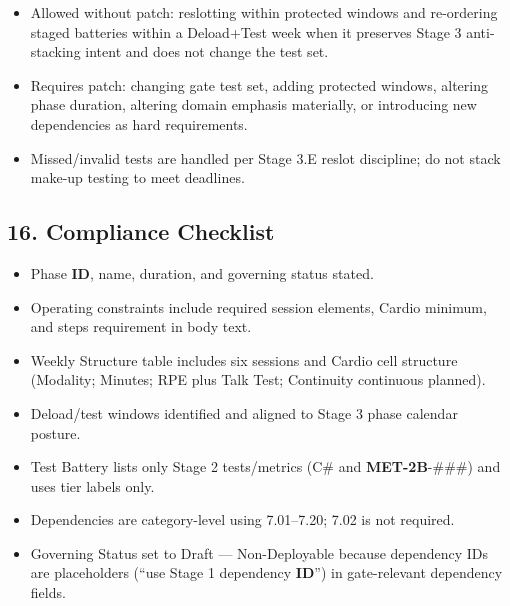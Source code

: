 \documentclass[10pt]{article}
\begin{document}
\begin{itemize}
\item Allowed without patch: reslotting within protected windows and re-ordering staged batteries within a Deload+Test week when it preserves Stage 3 anti-stacking intent and does not change the test set.
\item Requires patch: changing gate test set, adding protected windows, altering phase duration, altering domain emphasis materially, or introducing new dependencies as hard requirements.
\item Missed/invalid tests are handled per Stage 3.E reslot discipline; do not stack make-up testing to meet deadlines.
\end{itemize}

\subsection*{16. Compliance Checklist}

\begin{itemize}
\item Phase \textbf{ID}, name, duration, and governing status stated.
\item Operating constraints include required session elements, Cardio minimum, and steps requirement in body text.
\item Weekly Structure table includes six sessions and Cardio cell structure (Modality; Minutes; RPE plus Talk Test; Continuity continuous planned).
\item Deload/test windows identified and aligned to Stage 3 phase calendar posture.
\item Test Battery lists only Stage 2 tests/metrics (C\# and \textbf{MET-2B}-###) and uses tier labels only.
\item Dependencies are category-level using 7.01–7.20; 7.02 is not required.
\item Governing Status set to Draft — Non-Deployable because dependency IDs are placeholders (“use Stage 1 dependency \textbf{ID}”) in gate-relevant dependency fields.
\end{itemize}
\end{document}
